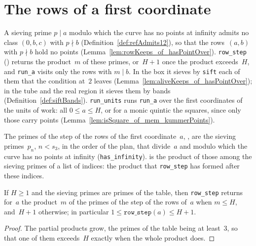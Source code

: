 \section{The rows of a first coordinate}\label{sec:rows}

A sieving prime $p \mid a$ modulo which the curve has no points at infinity admits no class
$(0, b, c)$ with $p \nmid b$ (Definition~\ref{def:refAdmits12}), so that the rows~$(a, b)$ with
$p \nmid b$ hold no points (Lemma~\ref{lem:rowKeeps_of_hasPointOver}). \texttt{row\_step}
() returns the product~$m$ of these primes, or~$H + 1$ once the
product exceeds~$H$, and \texttt{run\_a} visits only the rows with $m \mid b$. In the box it sieves
by \texttt{sift} each of them that the condition at~$2$ leaves
(Lemma~\ref{lem:aliveKeeps_of_hasPointOver}); in the tube and the real region it sieves them by
bands (Definition~\ref{def:siftBands}). \texttt{run\_units} runs \texttt{run\_a} over the first
coordinates of the units of work: all $0 \le a \le H$, or for a monic quintic the squares, since
only those carry points (Lemma~\ref{lem:isSquare_of_mem_kummerPoints}).

\begin{definition}\label{def:rowStepProd}
  \leanok
  The primes of the step of the rows of the first coordinate~$a$, ,
  are the sieving primes~$p_n$, $n < s_3$, in the order of the plan, that divide~$a$ and modulo
  which the curve has no points at infinity (\texttt{has\_infinity}). 
  is the product of those among the sieving primes of a list of indices: the product that
  \texttt{row\_step} has formed after these indices.
\end{definition}

\begin{lemma}\label{lem:run_rowStep}
  \leanok
  If $H \ge 1$ and the sieving primes are primes of the table, then \texttt{row\_step} returns
  for~$a$ the product~$m$ of the primes of the step of the rows of~$a$ when $m \le H$, and~$H + 1$
  otherwise; in particular $1 \le \texttt{row\_step}(a) \le H + 1$.
\end{lemma}

\begin{proof}
  \leanok
  The partial products grow, the primes of the table being at least~$3$, so that one of them
  exceeds~$H$ exactly when the whole product does.
\end{proof}

